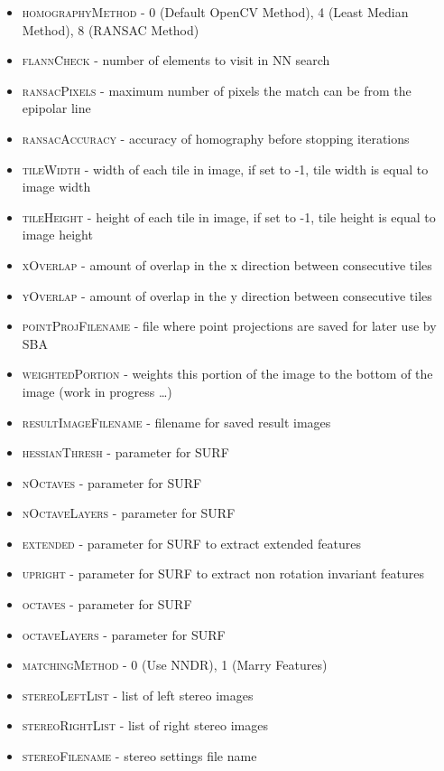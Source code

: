 \begin{itemize}
	\item{\textsc{homographyMethod}} - 0 (Default OpenCV Method), 4 (Least Median Method), 8 (RANSAC Method)
	\item{\textsc{flannCheck}} - number of elements to visit in NN search
	\item{\textsc{ransacPixels}} - maximum number of pixels the match can be from the epipolar line
	\item{\textsc{ransacAccuracy}} - accuracy of homography before stopping iterations
	\item{\textsc{tileWidth}} - width of each tile in image, if set to -1, tile width is equal to image width
	\item{\textsc{tileHeight}} - height of each tile in image, if set to -1, tile height is equal to image height
	\item{\textsc{xOverlap}} - amount of overlap in the x direction between consecutive tiles
	\item{\textsc{yOverlap}} - amount of overlap in the y direction between consecutive tiles
	\item{\textsc{pointProjFilename}} - file where point projections are saved for later use by SBA
	\item{\textsc{weightedPortion}} - weights this portion of the image to the bottom of the image (work in progress \ldots)
	\item{\textsc{resultImageFilename}} - filename for saved result images
	\item{\textsc{hessianThresh}} - parameter for SURF
	\item{\textsc{nOctaves}} - parameter for SURF
	\item{\textsc{nOctaveLayers}} - parameter for SURF
	\item{\textsc{extended}} - parameter for SURF to extract extended features
	\item{\textsc{upright}} - parameter for SURF to extract non rotation invariant features
	\item{\textsc{octaves}} - parameter for SURF
	\item{\textsc{octaveLayers}} - parameter for SURF
	\item{\textsc{matchingMethod}} - 0 (Use NNDR), 1 (Marry Features)
	\item{\textsc{stereoLeftList}} - list of left stereo images
	\item{\textsc{stereoRightList}} - list of right stereo images
	\item{\textsc{stereoFilename}} - stereo settings file name
\end{itemize}


